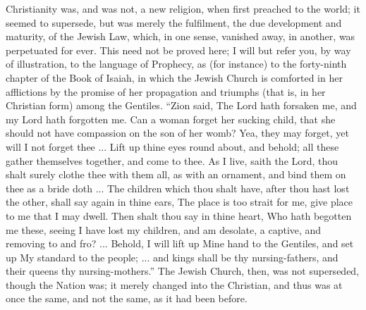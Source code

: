 Christianity was, and was not, a new religion, when first preached to
the world; it seemed to supersede, but was merely the fulfilment, the
due development and maturity, of the Jewish Law, which, in one sense,
vanished away, in another, was perpetuated for ever. This need not be
proved here; I will but refer you, by way of illustration, to the
language of Prophecy, as (for instance) to the forty-ninth chapter of
the Book of Isaiah, in which the Jewish Church is comforted in her
afflictions by the promise of her propagation and triumphs (that is, in
her Christian form) among the Gentiles. ``Zion said, The Lord hath
forsaken me, and my Lord hath forgotten me. Can a woman forget her
sucking child, that she should not have compassion on the son of her
womb? Yea, they may forget, yet will I not forget thee ... Lift up thine
eyes round about, and behold; all these gather themselves together, and
come to thee. As I live, saith the Lord, thou shalt surely clothe thee
with them all, as with an ornament, and bind them on thee as a bride
doth ... The children which thou shalt have, after thou hast lost the
other, shall say again in thine ears, The place is too strait for me,
give place to me that I may dwell. Then shalt thou say in thine heart,
Who hath begotten me these, seeing I have lost my children, and am
desolate, a captive, and removing to and fro? ... Behold, I will lift up
Mine hand to the Gentiles, and set up My standard to the people; ... and
kings shall be thy nursing-fathers, and their queens thy
nursing-mothers.'' The Jewish Church, then, was not superseded,
though the Nation was; it merely changed into the Christian, and thus
was at once the same, and not the same, as it had been before.

